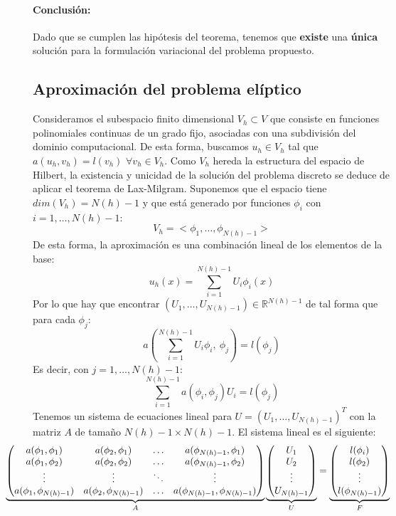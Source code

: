 \documentclass[spanish]{mathnotes}
\begin{document}
	\paragraph{Conclusión:} Dado que se cumplen las hipótesis del teorema, tenemos que \textbf{existe} una \textbf{única} solución para la formulación variacional del problema propuesto.
	\subsection{Aproximación del problema elíptico}
	Consideramos el subespacio finito dimensional $V_h\subset V$ que consiste en funciones polinomiales continuas de un grado fijo, asociadas con una subdivisión del dominio computacional. De esta forma, buscamos $u_h\in V_h$ tal que $a(u_h, v_h) = l(v_h)$ $\forall v_h\in V_h$. Como $V_h$ hereda la estructura del espacio de Hilbert, la existencia y unicidad de la solución del problema discreto se deduce de aplicar el teorema de Lax-Milgram. Suponemos que el espacio tiene $dim(V_h) = N(h)-1$ y que está generado por funciones $\phi_i$ con $i=1,\hdots, N(h)-1$:
	$$V_h = <\phi_1, \hdots, \phi_{N(h)-1}>$$
	De esta forma, la aproximación es una combinación lineal de los elementos de la base:
	$$u_h(x) = \sum_{i=1}^{N(h)-1} U_i\phi_i(x)$$
	Por lo que hay que encontrar $(U_1, \hdots, U_{N(h)-1})\in \mathbb{R}^{N(h)-1}$ de tal forma que para cada $\phi_j$:
	$$a\left(\sum_{i=1}^{N(h)-1} U_i\phi_i,\ \phi_j\right) = l(\phi_j)$$
	Es decir, con $j=1,\hdots,N(h)-1$:
	$$\sum_{i=1}^{N(h)-1} a(\phi_i, \phi_j) U_i = l(\phi_j)$$
	Tenemos un sistema de ecuaciones lineal para $U=(U_1, \hdots, U_{N(h)-1})^T$ con la matriz $A$ de tamaño $N(h)-1\times N(h)-1$. El sistema lineal es el siguiente:
	\begin{equation*}
	\hspace{-10mm}
	\underbrace{
	\begin{pmatrix}
		a(\phi_1, \phi_1) & a(\phi_2, \phi_1) & \hdots & a(\phi_{N(h)-1}, \phi_1)\\
		a(\phi_1, \phi_2) & a(\phi_2, \phi_2) & \hdots & a(\phi_{N(h)-1}, \phi_2)\\
		\vdots & \vdots & \ddots & \vdots \\
		a(\phi_1, \phi_{N(h)-1}) & a(\phi_2, \phi_{N(h)-1}) & \hdots & a(\phi_{N(h)-1}, \phi_{N(h)-1})\\
	\end{pmatrix}}_A
	\underbrace{
	\begin{pmatrix}
	U_1\\U_2\\\vdots\\U_{N(h)-1}
	\end{pmatrix}}_U
	=
	\underbrace{
	\begin{pmatrix}
		l(\phi_i)\\l(\phi_2)\\\vdots\\l(\phi_{N(h)-1})
	\end{pmatrix}}_F
	\end{equation*}
\end{document}
